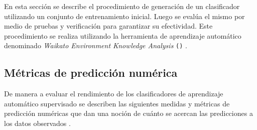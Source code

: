 En esta sección se describe el procedimiento de generación de un clasificador
 utilizando un conjunto de entrenamiento inicial. Luego
se evalúa el mismo por medio de pruebas y verificación para garantizar
su efectividad. Este procedimiento se realiza utilizando la herramienta
de aprendizaje automático denominado \emph{Waikato Environment Knowledge
Analysis} \texttt{()} \cite{Frank2016}. 

\subsection{Métricas de predicción numérica}

De manera a evaluar el rendimiento de los clasificadores de aprendizaje
automático supervisado se describen las siguientes medidas y métricas
de predicción numéricas que dan una noción de cuánto se acercan las
predicciones a los datos observados \cite{Witten2017}.

